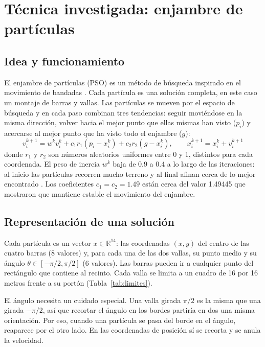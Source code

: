 \documentclass[11pt,letterpaper]{article}
\begin{document}
\section{Técnica investigada: enjambre de partículas}

\subsection{Idea y funcionamiento}
El enjambre de partículas (PSO) es un método de búsqueda inspirado en el movimiento de bandadas \citep{kennedy1995}. Cada partícula es una solución completa, en este caso un montaje de barras y vallas. Las partículas se mueven por el espacio de búsqueda y en cada paso combinan tres tendencias: seguir moviéndose en la misma dirección, volver hacia el mejor punto que ellas mismas han visto ($p_i$) y acercarse al mejor punto que ha visto todo el enjambre ($g$):
\begin{equation}
v_i^{k+1} = w^k v_i^k + c_1 r_1 (p_i - x_i^k) + c_2 r_2 (g - x_i^k), \qquad x_i^{k+1} = x_i^k + v_i^{k+1}
\end{equation}
donde $r_1$ y $r_2$ son números aleatorios uniformes entre 0 y 1, distintos para cada coordenada. El peso de inercia $w^k$ baja de 0.9 a 0.4 a lo largo de las iteraciones: al inicio las partículas recorren mucho terreno y al final afinan cerca de lo mejor encontrado \citep{shi1998}. Los coeficientes $c_1 = c_2 = 1.49$ están cerca del valor 1.49445 que \citet{clerc2002} mostraron que mantiene estable el movimiento del enjambre.

\subsection{Representación de una solución}
Cada partícula es un vector $x \in \mathbb{R}^{14}$: las coordenadas $(x, y)$ del centro de las cuatro barras (8 valores) y, para cada una de las dos vallas, su punto medio y su ángulo $\theta \in [-\pi/2, \pi/2]$ (6 valores). Las barras pueden ir a cualquier punto del rectángulo que contiene al recinto. Cada valla se limita a un cuadro de 16 por 16 metros frente a su portón (Tabla~\ref{tab:limites}).

El ángulo necesita un cuidado especial. Una valla girada $\pi/2$ es la misma que una girada $-\pi/2$, así que recortar el ángulo en los bordes partiría en dos una misma orientación. Por eso, cuando una partícula se pasa del borde en el ángulo, reaparece por el otro lado. En las coordenadas de posición sí se recorta y se anula la velocidad.
\end{document}

